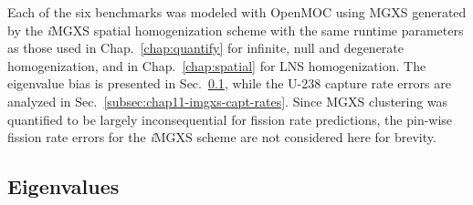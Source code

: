 Each of the six benchmarks was modeled with OpenMOC using \ac{MGXS} generated by the \textit{i}\ac{MGXS} spatial homogenization scheme with the same runtime parameters as those used in Chap.~\ref{chap:quantify} for infinite, null and degenerate homogenization, and in Chap.~\ref{chap:spatial} for \ac{LNS} homogenization. The eigenvalue bias is presented in Sec.~\ref{subsec:chap11-imgxs-eigenvalues}, while the U-238 capture rate errors are analyzed in Sec.~\ref{subsec:chap11-imgxs-capt-rates}. Since \ac{MGXS} clustering was quantified to be largely inconsequential for fission rate predictions, the pin-wise fission rate errors for the \textit{i}\ac{MGXS} scheme are not considered here for brevity.

\subsection{Eigenvalues}
\label{subsec:chap11-imgxs-eigenvalues}

